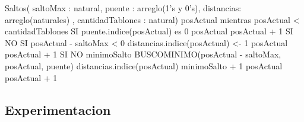     Saltos( saltoMax : natural, puente : arreglo(1's y 0's), distancias: arreglo(naturales) , cantidadTablones : natural)
		posActual 
		mientras posActual < cantidadTablones
			SI puente.indice(posActual) es 0
				posActual \leftarrow posActual + 1
			SI NO
				SI posActual - saltoMax < 0
					distancias.indice(posActual) <- 1
					posActual \leftarrow posActual + 1
				SI NO
					minimoSalto \leftarrow BUSCOMINIMO(posActual  - saltoMax, posActual, puente)
					distancias.indice(posActual) \leftarrow minimoSalto + 1
					posActual \leftarrow posActual + 1
			
			
			
\subsection{Experimentacion}

  

 
